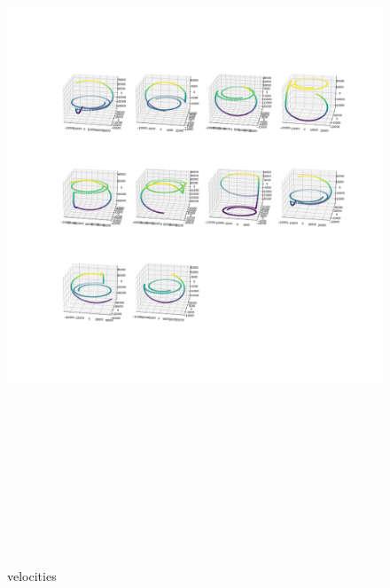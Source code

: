 \documentclass[12pt]{article}
\begin{document}
	\begin{figure}[H]
		\includegraphics[width=\linewidth, height=22cm]{subvs3.png} \caption{velocities} \label{subvs3}
	\end{figure}
\end{document}
